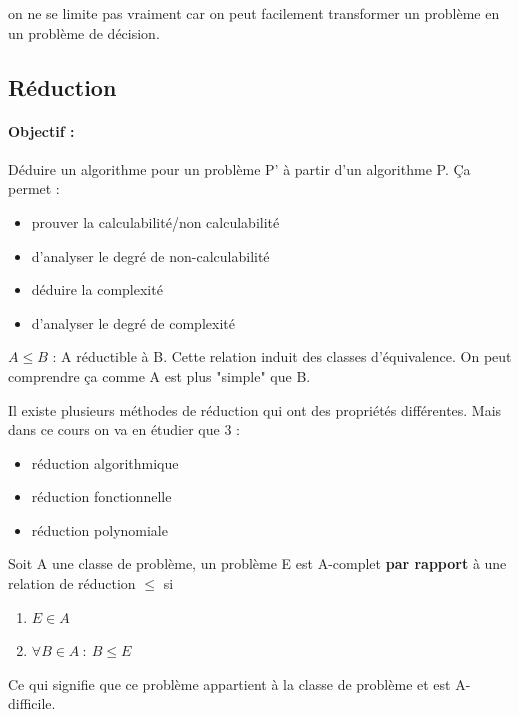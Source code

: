 \begin{myrem}
	on ne se limite pas vraiment car on 
	peut facilement transformer un problème en un problème de décision.
\end{myrem}

\subsection{Réduction}
\label{sub:r_duction}

\paragraph{Objectif :} Déduire un algorithme pour un problème P' à partir d'un 
algorithme P. Ça permet :
\begin{itemize}
	\item prouver la calculabilité/non calculabilité
	\item d'analyser le degré de non-calculabilité
	\item déduire la complexité
	\item d'analyser le degré de complexité
\end{itemize}

\begin{mydef}
	$A \leq B$ : A réductible à B. Cette relation induit des classes 
	d'équivalence. On peut comprendre ça comme A est plus "simple" que B.
\end{mydef}

Il existe plusieurs méthodes de réduction qui ont des propriétés différentes.
Mais dans ce cours on va en étudier 
que 3 :
\begin{itemize}
	\item réduction algorithmique
	\item réduction fonctionnelle 
	\item réduction polynomiale
\end{itemize}

\begin{mydef}[A-complet]
	Soit A une classe de problème, un problème E est A-complet
	\textbf{par rapport} à une relation de réduction $\leq$ si 
	\begin{enumerate}
		\item $E \in A$
		\item $\forall B \in A \ : \ B \leq E$
	\end{enumerate}
\end{mydef}

\begin{myrem}
	Ce qui signifie que ce problème appartient à la classe de problème et 
	est A-difficile.	
\end{myrem}

